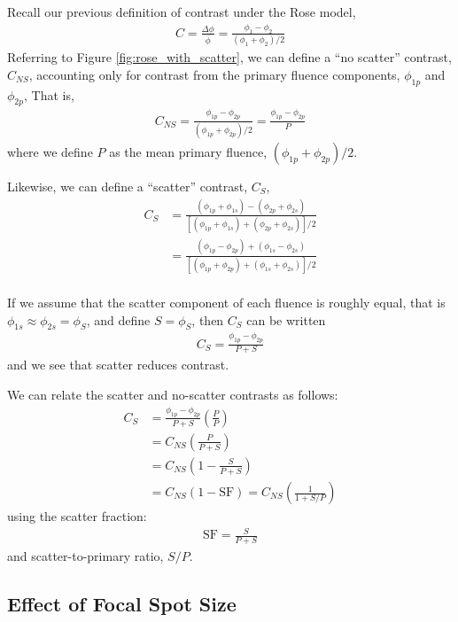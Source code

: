 \documentclass[mphy386-notes.tex]{subfiles}
\begin{document}

Recall our previous definition of contrast under the Rose model,
\begin{align}
  C = \frac{\Delta \phi}{\bar{\phi}} = \frac{\phi_1 - \phi_2}{(\phi_1 + \phi_2)/2}
\end{align}
Referring to Figure \ref{fig:rose_with_scatter}, we can define a
``no scatter'' contrast, $C_{NS}$, accounting only for contrast from
the primary fluence components, $\phi_{1p}$ and $\phi_{2p}$, That is,
\begin{align}
  C_{NS} = \frac{\phi_{1p} - \phi_{2p}}{(\phi_{1p} + \phi_{2p})/2} = \frac{\phi_{1p} - \phi_{2p}}{P}
\end{align}
where we define $P$ as the mean primary fluence, $(\phi_{1p} + \phi_{2p})/2$.

Likewise, we can define a ``scatter'' contrast, $C_S$,
\begin{align}
  C_S &= \frac{(\phi_{1p} + \phi_{1s}) - (\phi_{2p} + \phi_{2s})}{[(\phi_{1p} + \phi_{1s}) + (\phi_{2p} + \phi_{2s})]/2}\\
      &= \frac{(\phi_{1p} - \phi_{2p}) + (\phi_{1s} - \phi_{2s})}{[(\phi_{1p} + \phi_{2p}) + (\phi_{1s} + \phi_{2s})]/2}\\
\end{align}

If we assume that the scatter component of each fluence is roughly equal, that is $\phi_{1s} \approx \phi_{2s} = \phi_S$, and define $S = \phi_S$, then $C_S$ can be written
\begin{align}
  C_S = \frac{\phi_{1p} - \phi_{2p}}{P + S}
\end{align}
and we see that scatter reduces contrast.

We can relate the scatter and no-scatter contrasts as follows:
\begin{align}
  C_S &= \frac{\phi_{1p} - \phi_{2p}}{P + S}\left(\frac{P}{P}\right)\\
      &= C_{NS}\left(\frac{P}{P + S}\right)\\
      &= C_{NS}\left(1 - \frac{S}{P + S}\right) \\
      &= C_{NS}(1 - \text{SF}) = C_{NS}\left(\frac{1}{1 + S/P}\right)
\end{align}
using the scatter fraction:
\begin{align}
  \text{SF} = \frac{S}{P + S}
\end{align}
and scatter-to-primary ratio, $S/P$. 


\subsection{Effect of Focal Spot Size}


\pagebreak
\end{document}
